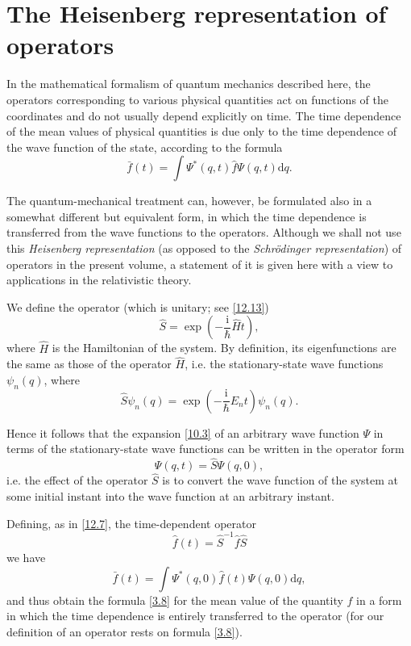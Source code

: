 \section{The Heisenberg representation of operators
}\label{The Heisenberg representation of operators
}
In the mathematical formalism of quantum mechanics described here, the operators corresponding to various physical quantities act on functions of the coordinates and do not usually depend explicitly on time. The time dependence of the mean values of physical quantities is due only to the time dependence of the wave function of the state, according to the formula
\begin{equation}\label{13.1}
\bar{f}(t)=\int\Psi^*(q,t)\hat{f}\Psi(q,t)\mathrm{d}q.
\end{equation}

The quantum-mechanical treatment can, however, be formulated also in a somewhat different but equivalent form, in which the time dependence is transferred from the wave functions to the operators. Although we shall not use this \textit{Heisenberg representation} (as opposed to the \textit{Schrödinger representation}) of operators in the present volume, a statement of it is given here with a view to applications in the relativistic theory.

We define the operator (which is unitary; see \eqref{12.13})
\begin{equation}\label{13.2}
\hat{S}=\exp\left(-\frac{\mathrm{i}}{\hbar}\hat{H}t \right),
\end{equation}
where $ \hat{H} $ is the Hamiltonian of the system. By definition, its eigenfunctions are the same as those of the operator $ \hat{H} $, i.e. the stationary-state wave functions $\psi_n(q)$, where
\begin{equation}\label{13.3}
\hat{S}\psi_n(q)=\exp(-\frac{\mathrm{i}}{\hbar}E_nt)\psi_n(q).
\end{equation}

Hence it follows that the expansion \eqref{10.3} of an arbitrary wave function $\Psi$ in terms of the stationary-state wave functions can be written in the operator form
\begin{equation}\label{13.4}
\Psi(q,t)=\hat{S}\Psi(q,0),
\end{equation}
i.e. the effect of the operator $\hat{S}$ is to convert the wave function of the system at some initial instant into the wave function at an arbitrary instant.

Defining, as in \eqref{12.7}, the time-dependent operator
\begin{equation}\label{13.5}
\hat{f}(t)=\hat{S}^{-1}\hat{f}\hat{S}
\end{equation}
we have
\begin{equation}\label{13.6}
\bar{f}(t)=\int\Psi^*(q,0)\hat{f}(t)\Psi(q,0)\mathrm{d}q,
\end{equation}
and thus obtain the formula \eqref{3.8} for the mean value of the quantity $ f $ in a form in which the time dependence is entirely transferred to the operator (for our definition of an operator rests on formula \eqref{3.8}).


